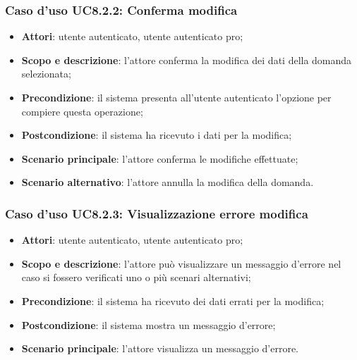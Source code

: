 	\subsubsection{Caso d'uso UC8.2.2: Conferma modifica}
	\begin{itemize}
		\item
			\textbf{Attori}: utente autenticato, utente autenticato pro;
		\item
			\textbf{Scopo e descrizione}: l'attore conferma la modifica dei dati della domanda selezionata;
		\item		
			\textbf{Precondizione}: il sistema presenta all'utente autenticato l'opzione per compiere questa operazione;
		\item
			\textbf{Postcondizione}: il sistema ha ricevuto i dati per la modifica;
		\item
	 		\textbf{Scenario principale}: l'attore conferma le modifiche effettuate;
	 	\item
	 		\textbf{Scenario alternativo}: l'attore annulla la modifica della domanda.
	\end{itemize}		
	\subsubsection{Caso d'uso UC8.2.3: Visualizzazione errore modifica}
	\begin{itemize}
		\item
			\textbf{Attori}: utente autenticato, utente autenticato pro;
		\item
			\textbf{Scopo e descrizione}: l'attore può visualizzare un messaggio d'errore nel caso si fossero verificati uno o più scenari alternativi;
		\item		
			\textbf{Precondizione}: il sistema ha ricevuto dei dati errati per la modifica;
		\item
			\textbf{Postcondizione}: il sistema mostra un messaggio d'errore;
		\item
	 		\textbf{Scenario principale}: l'attore visualizza un messaggio d'errore.
	\end{itemize}	
	
